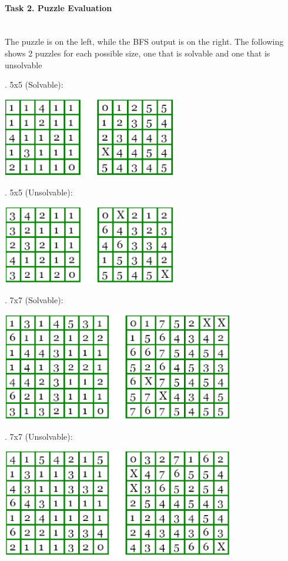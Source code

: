 \documentclass[12pt, letterpaper]{article}
\begin{document}
\pagebreak

\paragraph{Task 2. Puzzle Evaluation} \mbox{}\\

\quad The puzzle is on the left, while the BFS output is on the right. The following shows 2 puzzles for each possible size, one that is solvable and one that is unsolvable

\medskip
{}. 5x5 (Solvable):
	
\includegraphics[width=3in]{"Task 2/5x5 Puzzle (Solvable)"}

\bigskip
{}. 5x5 (Unsolvable):

\includegraphics[width=3in]{"Task 2/5x5 Puzzle (Unsolvable)"}

\bigskip
{}. 7x7 (Solvable):

\includegraphics[width=4in, keepaspectratio]{"Task 2/7x7 Puzzle (Solvable)"}

\bigskip	
{}. 7x7 (Unsolvable):

\includegraphics[width=4in, keepaspectratio]{"Task 2/7x7 Puzzle (Unsolvable)"}
\end{document}
